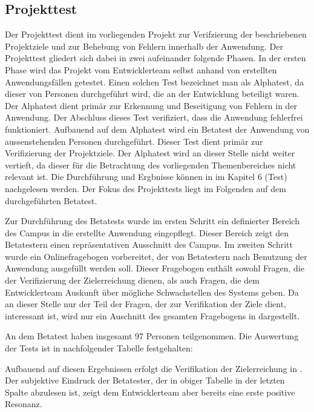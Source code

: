 \subsection{Projekttest}
\label{sec:Projekttest}

Der Projekttest dient im vorliegenden Projekt zur Verifzierung der beschriebenen
Projektziele und zur Behebung von Fehlern innerhalb der Anwendung. Der
Projekttest gliedert sich dabei in zwei aufeinander folgende Phasen. In der
ersten Phase wird das Projekt vom Entwicklerteam selbst anhand von erstellten
Anwendungsfällen getestet. Einen solchen Test bezeichnet man als Alphatest, da
dieser von Personen durchgeführt wird, die an der Entwicklung beteiligt waren.
Der Alphatest dient primär zur Erkennung und Beseitigung von Fehlern in der
Anwendung. Der Abschluss dieses Test verifiziert, dass die Anwendung fehlerfrei
funktioniert. Aufbauend auf dem Alphatest wird ein Betatest der Anwendung von
aussenstehenden Personen durchgeführt. Dieser Test dient primär zur
Verifizierung der Projektziele. Der Alphatest wird an dieser Stelle nicht weiter
vertieft, da dieser für die Betrachtung des vorliegenden Themenbereiches nicht
relevant ist. Die Durchführung und Ergbnisse können in
\citet{modelierungUndBetrieb2014} im Kapitel 6 (Test) nachgelesen werden. Der
Fokus des Projekttests liegt im Folgenden auf dem durchgeführten Betatest.

Zur Durchführung des Betatests wurde im ersten Schritt ein definierter Bereich
des Campus in die erstellte Anwendung eingepflegt. Dieser Bereich zeigt den
Betatestern einen repräsentativen Ausschnitt des Campus.
Im zweiten Schritt wurde ein Onlinefragebogen vorbereitet, der von Betatestern
nach Benutzung der Anwendung ausgefüllt werden soll. Dieser Fragebogen enthält 
sowohl Fragen, die der Verifizierung der Zielerreichung dienen, als auch
Fragen, die dem Entwicklerteam Auskunft über mögliche Schwachstellen des Systems geben.
Da an dieser Stelle nur der Teil der Fragen, der zur Verifikation der Ziele dient,
interessant ist, wird nur ein Auschnitt des gesamten Fragebogens in dargestellt.

An dem Betatest haben insgesamt 97 Personen teilgenommen. Die Auswertung der Tests ist in nachfolgender Tabelle
festgehalten:


Aufbauend auf diesen Ergebnissen erfolgt die Verifikation der Zielerreichung in .
Der subjektive Eindruck der Betatester, der in obiger Tabelle in der letzten Spalte abzulesen ist,
zeigt dem Entwicklerteam aber bereits eine erste positive Resonanz.